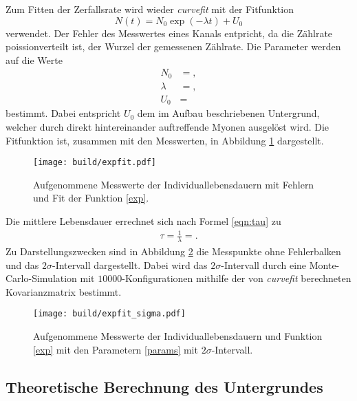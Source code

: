 Zum Fitten der Zerfallsrate wird wieder \emph{curvefit} mit der Fitfunktion
\begin{equation}
  N(t) = N_0 \exp{(-\lambda t)} + U_0 \label{exp}
\end{equation}
verwendet.
Der Fehler des Messwertes eines Kanals entpricht, da die Zählrate poissionverteilt ist, der Wurzel der gemessenen Zählrate. %
Die Parameter werden auf die Werte \label{params}
\begin{align*}
  N_0 &= ,\\
  \lambda &= ,\\
  U_0 &= 
\end{align*}
bestimmt.
Dabei entspricht $U_0$ dem im Aufbau beschriebenen Untergrund, welcher durch direkt hintereinander auftreffende Myonen ausgelöst wird.
Die Fitfunktion ist, zusammen mit den Messwerten, in Abbildung \ref{plot:punkte_err_fit} dargestellt.
\begin{figure}
  \centering
  \texttt{[image: build/expfit.pdf]}
  \caption{Aufgenommene Messwerte der Individuallebensdauern mit Fehlern und Fit der Funktion \ref{exp}.}
  \label{plot:punkte_err_fit}
\end{figure}
Die mittlere Lebensdauer errechnet sich nach Formel \eqref{eqn:tau} zu
\begin{align*}
  \tau = \frac{1}{\lambda} = .
\end{align*}
Zu Darstellungszwecken sind in Abbildung \ref{plot:punkte_sigma} die Messpunkte ohne Fehlerbalken und das $2\sigma$-Intervall dargestellt.
Dabei wird das $2\sigma$-Intervall durch eine Monte-Carlo-Simulation mit $\num{10000}$-Konfigurationen mithilfe der von \emph{curvefit} berechneten Kovarianzmatrix bestimmt.

\begin{figure}
  \centering
  \texttt{[image: build/expfit\_sigma.pdf]}
  \caption{Aufgenommene Messwerte der Individuallebensdauern und Funktion \ref{exp} mit den Parametern \ref{params} mit $2\sigma$-Intervall.}
  \label{plot:punkte_sigma}
\end{figure}


\subsection{Theoretische Berechnung des Untergrundes}

